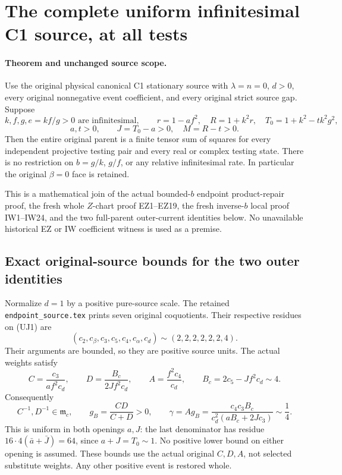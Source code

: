 \section{The complete uniform infinitesimal C1 source, at all tests}
\label{sec:uniform-c1-complete-current-join}

\paragraph{Theorem and unchanged source scope.}
Use the original physical canonical C1 stationary source with
$\lambda=n=0$, $d>0$, every original nonnegative event coefficient,
and every original strict source gap. Suppose
\[
 k,f,g,e=kf/g>0\text{ are infinitesimal},\qquad
 r=1-af^2,\quad R=1+k^2r,\quad T_0=1+k^2-tk^2g^2,
\]
\[
                         a,t>0,\qquad J=T_0-a>0,\quad M=R-t>0.
                                                               \tag{UJ1}
\]
Then the entire original parent is a finite tensor sum of squares
for every independent projective testing pair and every real or
complex testing state. There is no restriction on $b=g/k$, $g/f$,
or any relative infinitesimal rate. In particular the original
$\beta=0$ face is retained.

This is a mathematical join of the actual bounded-$b$ endpoint
product-repair proof, the fresh whole $Z$-chart proof EZ1--EZ19,
the fresh inverse-$b$ local proof IW1--IW24, and the two full-parent
outer-current identities below. No unavailable historical EZ or IW
coefficient witness is used as a premise.

\subsection{Exact original-source bounds for the two outer identities}

Normalize $d=1$ by a positive pure-source scale. The retained
\texttt{endpoint\_source.tex} prints seven original coquotients.
Their respective residues on (UJ1) are
\[
 (c_2,c_\beta,c_3,c_5,c_4,c_\alpha,c_d)
                    \sim(2,2,2,2,2,2,4).
\]
Their arguments are bounded, so they are positive source units.
The actual weights satisfy
\[
 C=\frac{c_3}{af^2c_d},\qquad
 D=\frac{B_c}{2Jf^2c_d},\qquad A=\frac{f^2c_4}{c_d},
 \qquad B_c=2c_5-Jf^2c_d\sim4.
\]
Consequently
\[
 C^{-1},D^{-1}\in\mathfrak m_c,\qquad
 g_B=\frac{CD}{C+D}>0,\qquad
 \gamma=A g_B=
 \frac{c_4c_3B_c}{c_d^2(aB_c+2Jc_3)}\sim\frac14.
                                                               \tag{UJ2}
\]
This is uniform in both openings $a,J$: the last denominator has
residue $16\cdot4(\bar a+\bar J)=64$, since $a+J=T_0\sim1$.
No positive lower bound on either opening is assumed.
These bounds use the actual original $C,D,A$, not selected
substitute weights. Any other positive event is restored whole.

